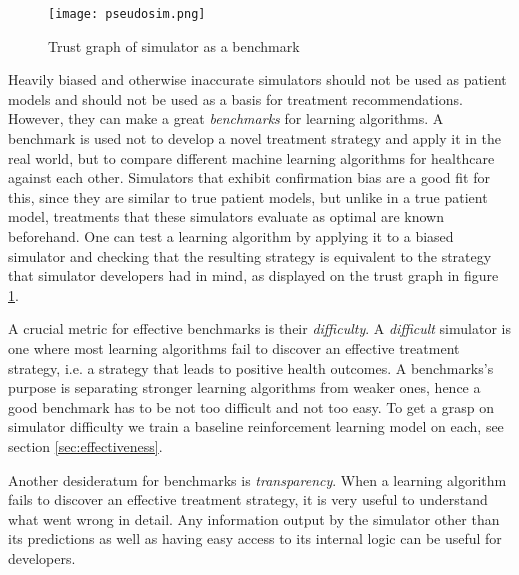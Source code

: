 \begin{figure}
    \centering
    \texttt{[image: pseudosim.png]}
    \caption{Trust graph of simulator as a benchmark}
    \label{fig:benchmark}
\end{figure}

Heavily biased and otherwise inaccurate simulators should not be used as patient models and should not be used as a basis for treatment recommendations. 
However, they can make a great \emph{benchmarks} for learning algorithms.
A benchmark is used not to develop a novel treatment strategy and apply it in the real world, but to compare different machine learning algorithms for healthcare against each other. 
Simulators that exhibit confirmation bias are a good fit for this, since they are similar to true patient models, but unlike in a true patient model, treatments that these simulators evaluate as optimal are known beforehand. 
One can test a learning algorithm by applying it to a biased simulator and checking that the resulting strategy is equivalent to the strategy that simulator developers had in mind, as displayed on the trust graph in figure \ref{fig:benchmark}.

A crucial metric for effective benchmarks is their \emph{difficulty}. 
A \emph{difficult} simulator is one where most learning algorithms fail to discover an effective treatment strategy, i.e. a strategy that leads to positive health outcomes.
A benchmarks's purpose is separating stronger learning algorithms from weaker ones, hence a good benchmark has to be not too difficult and not too easy.
To get a grasp on simulator difficulty we train a baseline reinforcement learning model on each, see section \ref{sec:effectiveness}.

Another desideratum for benchmarks is \emph{transparency}.
When a learning algorithm fails to discover an effective treatment strategy, it is very useful to understand what went wrong in detail.
Any information output by the simulator other than its predictions as well as having easy access to its internal logic can be useful for developers.

